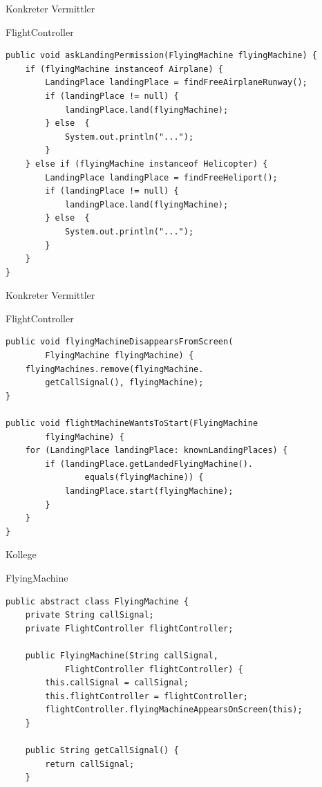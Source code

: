 \begin{frame}[fragile]{Konkreter Vermittler}
	\begin{exampleblock}{FlightController}
 		\begin{lstlisting}
public void askLandingPermission(FlyingMachine flyingMachine) {
    if (flyingMachine instanceof Airplane) {
        LandingPlace landingPlace = findFreeAirplaneRunway();
        if (landingPlace != null) {
            landingPlace.land(flyingMachine);
        } else  {
            System.out.println("...");
        }
    } else if (flyingMachine instanceof Helicopter) {
        LandingPlace landingPlace = findFreeHeliport();
        if (landingPlace != null) {
            landingPlace.land(flyingMachine);
        } else  {
            System.out.println("...");
        }
    }
}
        \end{lstlisting}
 	\end{exampleblock}
\end{frame}

\begin{frame}[fragile]{Konkreter Vermittler}
	\begin{exampleblock}{FlightController}
 		\begin{lstlisting}
public void flyingMachineDisappearsFromScreen(
        FlyingMachine flyingMachine) {
    flyingMachines.remove(flyingMachine.
        getCallSignal(), flyingMachine);
}

public void flightMachineWantsToStart(FlyingMachine 
        flyingMachine) {
    for (LandingPlace landingPlace: knownLandingPlaces) {
        if (landingPlace.getLandedFlyingMachine().
                equals(flyingMachine)) {
            landingPlace.start(flyingMachine);
        }
    }
}
    \end{lstlisting}
 	\end{exampleblock}
\end{frame}

\begin{frame}[fragile]{Kollege}
	\begin{exampleblock}{FlyingMachine}
 		\begin{lstlisting}
public abstract class FlyingMachine {
	private String callSignal;
	private FlightController flightController;
	
	public FlyingMachine(String callSignal, 
			FlightController flightController) {
		this.callSignal = callSignal;
		this.flightController = flightController;
		flightController.flyingMachineAppearsOnScreen(this);
	}
	
	public String getCallSignal() {
		return callSignal;
	}
        \end{lstlisting}
 	\end{exampleblock}
\end{frame}

